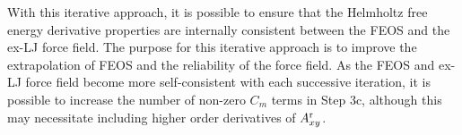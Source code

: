 \documentclass[11pt,a4paper]{article}
\begin{document}


With this iterative approach, it is possible to ensure that the Helmholtz free energy derivative properties are internally consistent between the FEOS and the ex-LJ force field. The purpose for this iterative approach is to improve the extrapolation of FEOS and the reliability of the force field. As the FEOS and ex-LJ force field become more self-consistent with each successive iteration, it is possible to increase the number of non-zero $C_m$ terms in Step 3c, although this may necessitate including higher order derivatives of $A_{xy}^{\rm r}$.

\end{document}
